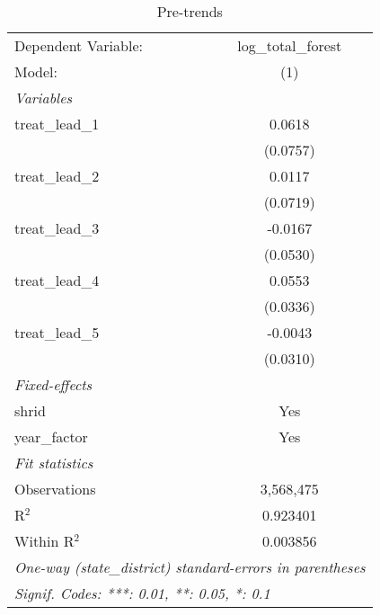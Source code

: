 \begin{table}[htbp]
\centering
\caption{Pre-trends}
\begin{tabular}{lc}
\tabularnewline\midrule\midrule
Dependent Variable:&log\_total\_forest\\
Model:&(1)\\
\midrule \emph{Variables}&  \\
treat\_lead\_1&0.0618\\
  &(0.0757)\\
treat\_lead\_2&0.0117\\
  &(0.0719)\\
treat\_lead\_3&-0.0167\\
  &(0.0530)\\
treat\_lead\_4&0.0553\\
  &(0.0336)\\
treat\_lead\_5&-0.0043\\
  &(0.0310)\\
\midrule \emph{Fixed-effects}&  \\
shrid & Yes\\
year\_factor & Yes\\
\midrule \emph{Fit statistics}&  \\
Observations & 3,568,475\\
R$^2$ & 0.923401\\
Within R$^2$ & 0.003856\\
\midrule\midrule\multicolumn{2}{l}{\emph{One-way (state\_district) standard-errors in parentheses}}\\
\multicolumn{2}{l}{\emph{Signif. Codes: ***: 0.01, **: 0.05, *: 0.1}}\\
\end{tabular}
\end{table}

